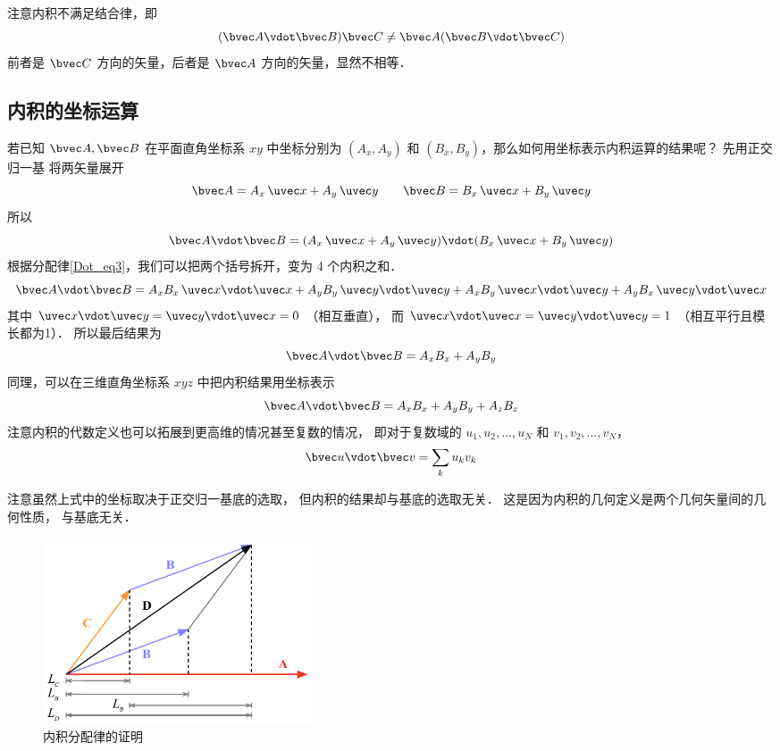 注意内积不满足结合律，即
\begin{equation}
(\bvec A \vdot \bvec B) \bvec C \ne  \bvec A (\bvec B \vdot \bvec C)
\end{equation}
前者是 $\bvec C$ 方向的矢量，后者是 $\bvec A$ 方向的矢量，显然不相等．

\subsection{内积的坐标运算}
若已知 $\bvec A, \bvec B$ 在平面直角坐标系 $xy$ 中坐标分别为 $(A_x, A_y)$ 和  $(B_x, B_y)$，那么如何用坐标表示内积运算的结果呢？ 先用正交归一基 将两矢量展开 %
\begin{equation}
\bvec A = A_x \,\uvec x + A_y \,\uvec y \qquad \bvec B = B_x \,\uvec x + B_y \,\uvec y
\end{equation}
所以
\begin{equation}
\bvec A \vdot \bvec B = (A_x \,\uvec x + A_y \,\uvec y) \vdot (B_x \,\uvec x + B_y \,\uvec y)
\end{equation}
根据分配律\autoref{Dot_eq3}，我们可以把两个括号拆开，变为 4 个内积之和． 
\begin{equation}
\bvec A \vdot \bvec B = A_x B_x \,\uvec x \vdot \uvec x + A_y B_y \,\uvec y \vdot \uvec y + A_x B_y \,\uvec x \vdot \uvec y + A_y B_x \,\uvec y \vdot \uvec x
\end{equation}
其中 $\uvec x \vdot \uvec y = \uvec y \vdot \uvec x = 0$ （相互垂直）， 而 $\uvec x \vdot \uvec x = \uvec y \vdot \uvec y = 1$ （相互平行且模长都为1）． 所以最后结果为
\begin{equation}
\bvec A \vdot \bvec B = A_x B_x + A_y B_y
\end{equation}
同理，可以在三维直角坐标系 $xyz$ 中把内积结果用坐标表示
\begin{equation}
\bvec A \vdot \bvec B = A_x B_x + A_y B_y + A_z B_z	
\end{equation}
注意内积的代数定义也可以拓展到更高维的情况甚至复数的情况， 即对于复数域的 $u_1, u_2, \dots, u_N$ 和 $v_1, v_2, \dots, v_N$，
\begin{equation}
\bvec u \vdot \bvec v = \sum_k u_k v_k
\end{equation}

注意虽然上式中的坐标取决于正交归一基底的选取， 但内积的结果却与基底的选取无关． 这是因为内积的几何定义是两个几何矢量间的几何性质， 与基底无关．

\begin{figure}[ht]
\centering
\includegraphics[width=8cm]{./figures/Dot2.pdf}
\caption{内积分配律的证明} \label{Dot_fig2}
\end{figure}

